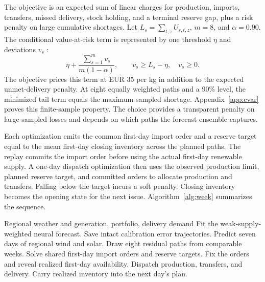The objective is an expected sum of linear charges for production, imports, transfers, missed delivery, stock holding, and a terminal reserve gap, plus a risk penalty on large cumulative shortages. Let $L_s=\sum_{t,z}U_{s,t,z}$, $m=8$, and $\alpha=0.90$. The conditional value-at-risk term is represented by one threshold $\eta$ and deviations $v_s$ \citep{rockafellar2000}:
\begin{equation}
\label{eq:risk}
\eta+\frac{\sum_{s=1}^{m}v_s}{m(1-\alpha)},\qquad
v_s\ge L_s-\eta,\quad v_s\ge 0.
\end{equation}
The objective prices this term at EUR 35 per kg in addition to the expected unmet-delivery penalty. At eight equally weighted paths and a 90\% level, the minimized tail term equals the maximum sampled shortage. Appendix~\ref{app:cvar} proves this finite-sample property. The choice provides a transparent penalty on large sampled losses and depends on which paths the forecast ensemble captures.

Each optimization emits the common first-day import order and a reserve target equal to the mean first-day closing inventory across the planned paths. The replay commits the import order before using the actual first-day renewable supply. A one-day dispatch optimization then uses the observed production limit, planned reserve target, and committed orders to allocate production and transfers. Falling below the target incurs a soft penalty. Closing inventory becomes the opening state for the next issue. Algorithm~\ref{alg:week} summarizes the sequence.

\begin{algorithm}[t]
\caption{Regional forecast and reserve recommendation}
\label{alg:week}
\small
\begin{algorithmic}[1]
\Require Regional weather and generation, portfolio, delivery demand
\State Fit the weak-supply-weighted neural forecast.
\State Save intact calibration error trajectories.
  \State Predict seven days of regional wind and solar.
  \State Draw eight residual paths from comparable weeks.
  \State Solve shared first-day import orders and reserve targets.
  \State Fix the orders and reveal realized first-day availability.
  \State Dispatch production, transfers, and delivery.
  \State Carry realized inventory into the next day's plan.
\EndFor
\end{algorithmic}
\end{algorithm}
